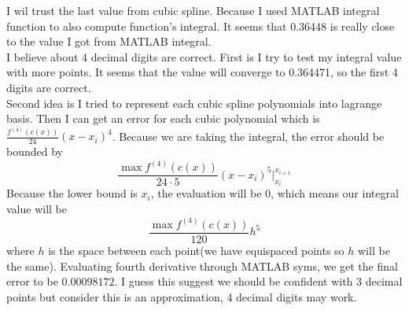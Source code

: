 \documentclass{article}
\begin{document}
I wil trust the last value from cubic spline. Because I used MATLAB integral function to also compute function's integral.
It seems that 0.36448 is really close to the value I got from MATLAB integral.
\\
I believe about 4 decimal digits are correct. First is I try to test my integral value with more points.
It seems that the value will converge to 0.364471, so the first 4 digits are correct.
\\
Second idea is I tried to represent each cubic spline polynomials into lagrange basis.
Then I can get an error for each cubic polynomial which is $\frac{f^{(4)}(c(x))}{24}(x-x_i)^4$.
Because we are taking the integral, the error should be bounded by 
$$\frac{\max{f^{(4)}(c(x))}}{24\cdot5}(x-x_i)^5 |^{x_{i+1}}_{x_i}$$
Because the lower bound is $x_i$, the evaluation will be 0, which means our integral value will be 
$$\frac{\max{f^{(4)}(c(x))}}{120}h^5$$
where $h$ is the space between each point(we have equispaced points so $h$ will be the same).
Evaluating fourth derivative through MATLAB syms, we get the final error to be $0.00098172$.
I guess this suggest we should be confident with 3 decimal points but consider this is an approximation, 4 decimal digits may work.
\end{document}
